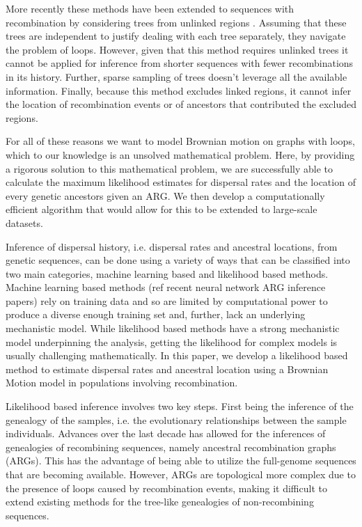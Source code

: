 More recently these methods have been extended to sequences with recombination by considering trees from unlinked regions \citep{Osmond2021}. Assuming that these trees are independent to justify dealing with each tree separately, they navigate the problem of loops. However, given that this method requires unlinked trees it cannot be applied for inference from shorter sequences with fewer recombinations in its history. Further, sparse sampling of trees doesn't leverage all the available information. Finally, because this method excludes linked regions, it cannot infer the location of recombination events or of ancestors that contributed the excluded regions.

For all of these reasons we want to model Brownian motion on graphs with loops, which to our knowledge is an unsolved mathematical problem. 
Here, by providing a rigorous solution to this mathematical problem, we are successfully able to calculate the maximum likelihood estimates for dispersal rates and the location of every genetic ancestors given an ARG. We then develop a computationally efficient algorithm that would allow for this to be extended to large-scale datasets. 






Inference of dispersal history, i.e. dispersal rates and ancestral locations, from genetic sequences, can be done using a variety of ways that can be classified into two main categories, machine learning based and likelihood based methods.
Machine learning based methods (ref recent neural network ARG inference papers) rely on training data and so are limited by computational power to produce a diverse enough training set and, further, lack an underlying mechanistic model. While likelihood based methods have a strong mechanistic model underpinning the analysis, getting the likelihood for complex models is usually challenging mathematically. In this paper, we develop a likelihood based method to estimate dispersal rates and ancestral location using a Brownian Motion model in populations involving recombination.

Likelihood based inference involves two key steps. First being the inference of the genealogy of the samples, i.e. the evolutionary relationships between the sample individuals. Advances over the last decade has allowed for the inferences of genealogies of recombining sequences, namely ancestral recombination graphs (ARGs). This has the advantage of being able to utilize the full-genome sequences that are becoming available. However, ARGs are topological more complex due to the presence of loops caused by recombination events, making it difficult to extend existing methods for the tree-like genealogies of non-recombining sequences. 

